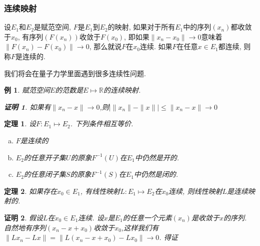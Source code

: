 \documentclass[a4paper,11pt]{article}
\theoremstyle{mystyle}
\newtheorem{theorem}{\hspace{2em}定理}[section]
\newtheorem{Proof}{\hspace{2em}证明}[section]
\newtheorem{example}{\hspace{2em}例}[section]
\begin{document}
\subsubsection*{连续映射}
\begin{definition}
  设$E_1$和$E_2$是赋范空间, $F$是$E_1$到$E_2$的映射, 如果对于所有$E_1$中的序列$(x_n)$都收敛于$x_0$, 有序列$(F(x_n))$收敛于$F(x_0)$, 即如果$\|x_n-x_0\|\to0$意味着$\|F(x_n)-F(x_0)\|\to0$, 那么就说$F$在$x_0$连续. 如果$F$在任意$x\in E_1$都连续, 则称$F$是连续的.
\end{definition}
我们将会在量子力学里面遇到很多连续性问题.
\begin{example}
  赋范空间$E$的范数是$E\mapsto\mathbb{R}$的连续映射.
  \begin{Proof}
    如果有$\|x_n-x\|\to0$,则$|\|x_n\|-\|x\||\leq\|x_n-x\|\to 0$
  \end{Proof}
\end{example}
\begin{theorem}
  设$F:E_1\mapsto E_2$. 下列条件相互等价.
  \begin{enumerate}[(a)]
    \item $F$是连续的
    \item $E_2$的任意开子集$U$的原象$F^{-1}(U)$在$E_1$中仍然是开的.
    \item $E_2$的任意闭子集$S$的原象$F^{-1}(S)$在$E_1$中仍然是闭的.
  \end{enumerate}
\end{theorem}
\begin{theorem}\label{continuous linear map}
  如果存在$x_0\in E_1$, 有线性映射$L:E_1\mapsto E_2$在$x_0$连续, 则线性映射$L$是连续映射的.
\end{theorem}
\begin{Proof}
  假设$L$在$x_0\in E_1$连续. 设$x$是$E_1$的任意一个元素$(x_n)$是收敛于$x$的序列. 自然地有序列$(x_n-x+x_0)$收敛于$x_0$,这样我们有$\|Lx_n-Lx\|=\|L(x_n-x+x_0)-Lx_0\|\to 0$. 得证
\end{Proof}
\end{document}
